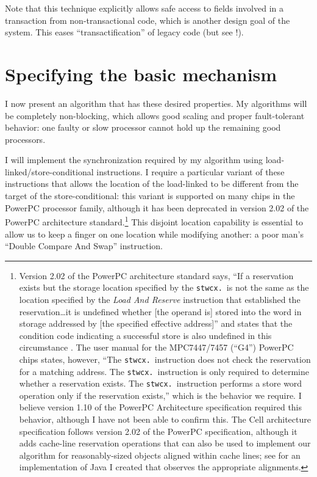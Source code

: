 Note that this technique explicitly allows safe access to fields
involved in a transaction from non-transactional code, which is
another design goal of the system.  This eases ``transactification''
of legacy code (but see !).

\section{Specifying the basic mechanism}
I now present an algorithm that has these desired properties.
My algorithms will be completely non-blocking, which allows good
scaling and proper fault-tolerant behavior: one faulty or slow
processor cannot hold up the remaining good processors.

I will implement the synchronization required by my algorithm using
load-linked/store-conditional instructions.  I require a particular
variant of these instructions that allows the location of the
load-linked to be different from the target of the store-conditional:
this variant is supported on many chips in the PowerPC processor family,
although it has been deprecated in version 2.02 of the PowerPC
architecture standard.\footnote{Version 2.02 of the PowerPC
architecture standard says, ``If a reservation exists but the storage
location specified by the \texttt{stwcx.}\ is not the same as the
location specified by the \textit{Load And Reserve} instruction that
established the reservation\ldots it is undefined whether [the operand
is] stored into the word in storage addressed by [the specified
effective address]'' and states that the condition code indicating a
successful store is also undefined in this circumstance \cite[p 25]{PPCII202}.
The user manual for the MPC7447/7457 (``G4'') PowerPC chips states,
however, ``The \texttt{stwcx.}\ instruction does not check the
reservation for a matching address.  The \texttt{stwcx.}\ instruction
is only required to determine whether a reservation exists.  The
\texttt{stwcx.}\ instruction performs a store word operation only if
the reservation exists,'' \cite[Section 3.3.3.6]{MPC7450UM} which is
the behavior we require.  I believe version 1.10 of the PowerPC
Architecture specification required this behavior, although I have not
been able to confirm this.  The Cell architecture specification
follows version 2.02 of the PowerPC specification, although it adds
cache-line reservation operations that can also be used to
implement our algorithm for reasonably-sized objects aligned within
cache lines; see \cite{WitchelLaAnAs01} for an implementation of Java
I created that observes the appropriate alignments.}  This disjoint location
capability is essential to allow us to keep a finger on one location
while modifying another: a poor man's ``Double Compare And Swap''
instruction.

